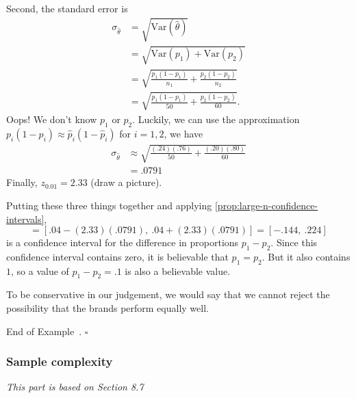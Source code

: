 \documentclass[10pt]{article}
\theoremstyle{definition}
\newtheorem{example}[theorem]{Example}
\renewenvironment{example}
{\begin{oldexample}}
  {\par\smallskip\hfill   End of Example~\theexample. $\square$    \par\end{oldexample}}
\newcommand{\1}[1]{\textbf{1}_{\left[#1\right]}} %
\def\Var{\mathrm{Var}} %
\begin{document}
\begin{example}[Example 8.8 in textbook]
  Second, the standard error is
  \begin{align*}
    \sigma_{\widehat{\theta}} 
    &= \sqrt{\Var(\widehat{\theta})}\\
    &= \sqrt{\Var(p_{1})+\Var(p_{2})}\\
    &= \sqrt{\frac{p_{1}(1-p_{1})}{n_{1}} +\frac{p_{2}(1-p_{2})}{n_{2}}}\\
    &= \sqrt{\frac{p_{1}(1-p_{1})}{50} +\frac{p_{2}(1-p_{2})}{60}}.
  \end{align*}
  Oops! We don't know $p_{1}$ or $p_{2}$. Luckily, we can use the approximation
  $p_{i}(1-p_{i})\approx \widehat{p}_{i}(1-\widehat{p}_{i})$ for $i=1,2$, we
  have
  \begin{align*}
    \sigma_{\widehat{\theta}} 
    &\approx \sqrt{\frac{(.24)(.76)}{50} +\frac{(.20)(.80)}{60}}\\
    &= .0791
  \end{align*}
  Finally, $z_{0.01}=2.33$ (draw a picture).

  Putting these three things together and applying \cref{prop:large-n-confidence-intervals},
  \begin{equation*}
    [\widehat{\theta}_{L},\widehat{\theta}_{U}] = [.04-(2.33)(.0791),\ .04+(2.33)(.0791)] = [-.144,\ .224]
  \end{equation*}
  is a confidence interval for the difference in proportions $p_{1}-p_{2}$.
  Since this confidence interval contains zero, it is believable that
  $p_{1}=p_{2}$. But it also contains $1$, so a value of $p_{1}-p_{2}=.1$ is
  also a believable value.

  To be conservative in our judgement, we would say that we cannot reject the
  possibility that the brands perform equally well.
\end{example}


\subsubsection{Sample complexity}
\textit{This part is based on Section 8.7}
\end{document}
